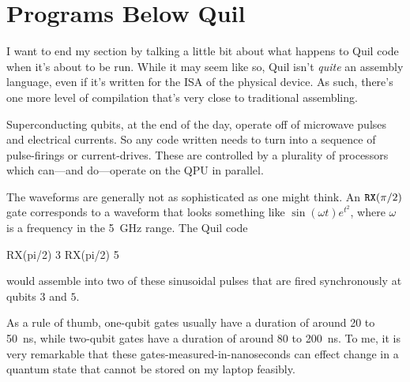 \section{Programs Below Quil}

I want to end my section by talking a little bit about what happens to Quil code when it's about to be run. While it may seem like so, Quil isn't \emph{quite} an assembly language, even if it's written for the ISA of the physical device. As such, there's one more level of compilation that's very close to traditional assembling.

Superconducting qubits, at the end of the day, operate off of microwave pulses and electrical currents. So any code written needs to turn into a sequence of pulse-firings or current-drives. These are controlled by a plurality of processors which can---and do---operate on the QPU in parallel.

The waveforms are generally not as sophisticated as one might think. An $\mathtt{RX}(\pi/2)$ gate corresponds to a waveform that looks something like $\sin(\omega t)e^{t^2}$, where $\omega$ is a frequency in the 5~GHz range. The Quil code
\begin{quil}
RX(pi/2) 3
RX(pi/2) 5
\end{quil}
would assemble into two of these sinusoidal pulses that are fired synchronously at qubits $3$ and $5$.

As a rule of thumb, one-qubit gates usually have a duration of around 20 to 50~ns, while two-qubit gates have a duration of around 80 to 200~ns. To me, it is very remarkable that these gates-measured-in-nanoseconds can effect change in a quantum state that cannot be stored on my laptop feasibly.